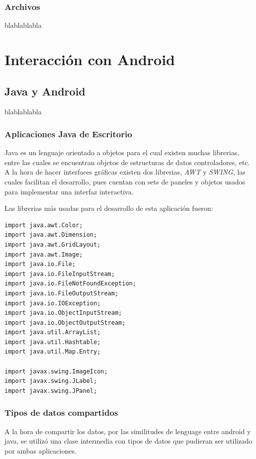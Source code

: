 \documentclass[11pt]{book}
\begin{document}
\section{Archivos}
blablablabla


\part{Interacción con Android}  

\chapter{Java y Android}
blablablabla              
\section{Aplicaciones Java de Escritorio}
Java es un lenguaje orientado a objetos para el cual existen muchas librerias, entre las cuales se encuentran objetos de estructuras de datos controladores, etc. A la hora de hacer interfaces gráficas existen dos librerias, \emph{AWT} y \emph{SWING}, las cuales facilitan el desarrollo, pues cuentan con sets de paneles y objetos usados para implementar una interfaz interactiva.

Las librerias más usadas para el desarrollo de esta aplicación fueron:

\begin{lstlisting}
import java.awt.Color;
import java.awt.Dimension;
import java.awt.GridLayout;
import java.awt.Image;
import java.io.File;
import java.io.FileInputStream;
import java.io.FileNotFoundException;
import java.io.FileOutputStream;
import java.io.IOException;
import java.io.ObjectInputStream;
import java.io.ObjectOutputStream;
import java.util.ArrayList;
import java.util.Hashtable;
import java.util.Map.Entry;

import javax.swing.ImageIcon;
import javax.swing.JLabel;
import javax.swing.JPanel;
\end{lstlisting}

\section{Tipos de datos compartidos}
A la hora de compartir los datos, por las similitudes de lenguage entre android y java, se utilizó una clase intermedia con tipos de datos que pudieran ser utilizado por ambas aplicaciones.
\end{document}
